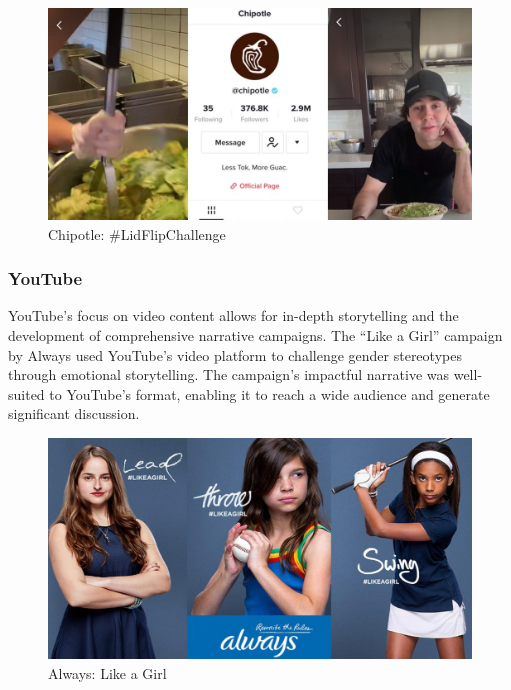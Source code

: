 \documentclass[
]{book}
\begin{document}
\begin{figure}
\centering
\includegraphics[width=1\textwidth,height=\textheight]{images/chipotle.jpg}
\caption{Chipotle: \#LidFlipChallenge}
\end{figure}

\hypertarget{youtube}{%
\subsubsection*{YouTube}\label{youtube}}

YouTube's focus on video content allows for in-depth storytelling and the development of comprehensive narrative campaigns. The ``Like a Girl'' campaign by Always used YouTube's video platform to challenge gender stereotypes through emotional storytelling. The campaign's impactful narrative was well-suited to YouTube's format, enabling it to reach a wide audience and generate significant discussion.

\begin{figure}
\centering
\includegraphics[width=1\textwidth,height=\textheight]{images/always.jpg}
\caption{Always: Like a Girl}
\end{figure}
\end{document}
